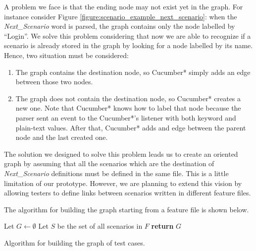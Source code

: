 A problem we face is that the ending node may not exist yet in the graph. For instance consider Figure \ref{figure:scenario_example_next_scenario}: when the \textit{Next\_Scenario} word is parsed, the graph contains only the node labelled by ``Login''. We solve this problem considering that now we are able to recognize if a scenario is already stored in the graph by looking for a node labelled by its name. Hence, two situation must be considered:

\begin{enumerate}
\item The graph contains the destination node, so Cucumber* simply adds an edge between those two nodes.
\item The graph does not contain the destination node, so Cucumber* creates a new one. Note that Cucumber* knows how to label that node because the parser sent an event to the Cucumber*'s listener with both keyword and plain-text values. After that, Cucumber* adds and edge between the parent node and the last created one.
\end{enumerate}

The solution we designed to solve this problem leads us to create an oriented graph by assuming that all the scenarios which are the destination of \textit{Next\_Scenario} definitions must be defined in the same file. This is a little limitation of our prototype. However, we are planning to extend this vision by allowing testers to define links between scenarios written in different feature files.

\noindent The algorithm for building the graph starting from a feature file is shown below.

\vspace{0.2cm}
\begin{algorithm}[H]
	Let $G \leftarrow \emptyset$\;
	Let $S$ be the set of all scenarios in $F$\;
	\textbf{return} $G$\;
	\vspace{0.2cm}
	\caption{Algorithm for building the graph of test cases.}
\end{algorithm}
\vspace{0.2cm}

